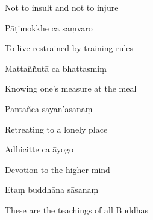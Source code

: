\begin{cprenglish}
  Not to insult and not to injure
\end{cprenglish}

Pāṭimokkhe ca saṃvaro

\begin{cprenglish}
  To live restrained by training rules
\end{cprenglish}

Mattaññutā ca bhattasmiṃ

\begin{cprenglish}
  Knowing one's measure at the meal
\end{cprenglish}

Pantañca sayan'āsanaṃ

\begin{cprenglish}
  Retreating to a lonely place
\end{cprenglish}

Adhicitte ca āyogo

\begin{cprenglish}
  Devotion to the higher mind
\end{cprenglish}

Etaṃ buddhāna sāsanaṃ

\begin{cprenglish}
  These are the teachings of all Buddhas
\end{cprenglish}

